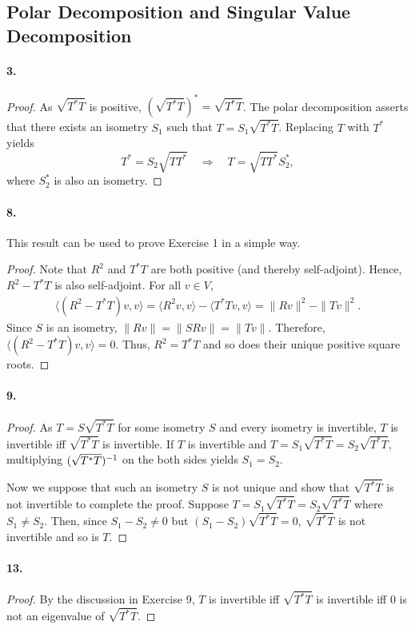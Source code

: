 \subsection{Polar Decomposition and Singular Value Decomposition}
  \paragraph{3.}
  \begin{proof}
    As $\sqrt{T^*T}$ is positive, $(\sqrt{T^*T})^*=\sqrt{T^*T}$. The polar 
    decomposition asserts that there exists an isometry $S_1$ such that
    $T=S_1\sqrt{T^*T}$. Replacing $T$ with $T^*$ yields
    \[
      T^*=S_2\sqrt{TT^*} \quad\Rightarrow\quad
      T=\sqrt{TT^*}S_2^*,
    \]
    where $S_2^*$ is also an isometry.
  \end{proof}

  \paragraph{8.}
    This result can be used to prove Exercise 1 in a simple way.
  \begin{proof}
    Note that $R^2$ and $T^*T$ are both positive (and thereby self-adjoint). 
    Hence, $R^2-T^*T$ is also self-adjoint. For all $v\in V$,
    \begin{align*}
      \langle(R^2-T^*T)v,v\rangle 
      = \langle R^2v,v\rangle - \langle T^*Tv,v\rangle 
      = \|Rv\|^2 - \|Tv\|^2.
    \end{align*}
    Since $S$ is an isometry, $\|Rv\| = \|SRv\| = \|Tv\|$. Therefore, $\langle
    (R^2-T^*T)v,v\rangle=0$. Thus, $R^2=T^*T$ and so does their unique positive
    square roots.
  \end{proof}

  \paragraph{9.}
  \begin{proof}
    As $T=S\sqrt{T^*T}$ for some isometry $S$ and every isometry is invertible,
    $T$ is invertible iff $\sqrt{T^*T}$ is invertible. If $T$ is invertible and
    $T=S_1\sqrt{T^*T}=S_2\sqrt{T^*T}$, multiplying $(\sqrt{T^*T})^{-1}$ on the 
    both sides yields $S_1=S_2$. \par
    Now we suppose that such an isometry $S$ is not unique and show that 
    $\sqrt{T^*T}$ is not invertible to complete the proof. Suppose $T=S_1
    \sqrt{T^*T}=S_2\sqrt{T^*T}$ where $S_1\ne S_2$. Then, since $S_1-S_2\ne 0$
    but $(S_1-S_2)\sqrt{T^*T}=0$, $\sqrt{T^*T}$ is not invertible and so is $T$.
  \end{proof}

  \paragraph{13.}
  \begin{proof}
    By the discussion in Exercise 9, $T$ is invertible iff $\sqrt{T^*T}$ is 
    invertible iff $0$ is not an eigenvalue of $\sqrt{T^*T}$.
  \end{proof}

